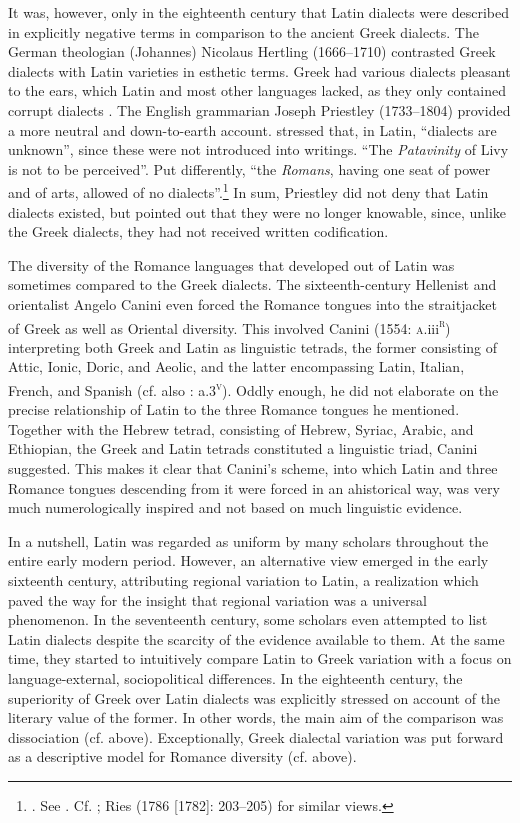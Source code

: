 It was, however, only in the eighteenth century that Latin dialects were described in explicitly negative terms in comparison to the ancient Greek dialects. The German theologian (Johannes) Nicolaus Hertling (1666–1710) contrasted Greek dialects with Latin varieties in esthetic terms. Greek had various dialects pleasant to the ears, which Latin and most other languages lacked, as they only contained corrupt dialects \citep[73]{Hertling1708}. The English grammarian Joseph Priestley (1733–1804) provided a more neutral and down-to-earth account. \citet[138]{Priestley1762} stressed that, in Latin, “dialects are unknown”, since these were not introduced into writings. “The \textit{Patavinity} of Livy is not to be perceived”. Put differently, “the \textit{Romans}, having one seat of power and of arts, allowed of no dialects”.\footnote{\citet[280]{Priestley1762}. See \citet[52]{Amsler1993}. Cf. \citet[49]{Galiani1779}; Ries (1786 [1782]: 203–205) for similar views.} In sum, Priestley did not deny that Latin dialects existed, but pointed out that they were no longer knowable, since, unlike the Greek dialects, they had not received written codification.

The diversity of the Romance languages that developed out of Latin was sometimes compared to the Greek dialects. The sixteenth-century Hellenist and orientalist Angelo Canini even forced the Romance tongues into the straitjacket of Greek as well as Oriental diversity. This involved Canini (1554: \textsc{a}.iii\textsc{\textsuperscript{r}}) interpreting both Greek and Latin as linguistic tetrads, the former consisting of Attic, Ionic, Doric, and Aeolic, and the latter encompassing Latin, Italian, French, and Spanish (cf. also \citealt{Canini1555}: a.3\textsc{\textsuperscript{v}}). Oddly enough, he did not elaborate on the precise relationship of Latin to the three Romance tongues he mentioned. Together with the Hebrew tetrad, consisting of Hebrew, Syriac, Arabic, and Ethiopian, the Greek and Latin tetrads constituted a linguistic triad, Canini suggested. This makes it clear that Canini’s scheme, into which Latin and three Romance tongues descending from it were forced in an ahistorical way, was very much numerologically inspired and not based on much linguistic evidence.

In a nutshell, Latin was regarded as uniform by many scholars throughout the entire early modern period. However, an alternative view emerged in the early sixteenth century, attributing regional variation to Latin, a realization which paved the way for the insight that regional variation was a universal phenomenon. In the seventeenth century, some scholars even attempted to list Latin dialects despite the scarcity of the evidence available to them. At the same time, they started to intuitively compare Latin to Greek variation with a focus on language-external, sociopolitical differences. In the eighteenth century, the superiority of Greek over Latin dialects was explicitly stressed on account of the literary value of the former. In other words, the main aim of the comparison was dissociation (cf.  above). Exceptionally, Greek dialectal variation was put forward as a descriptive model for Romance diversity (cf.  above).

